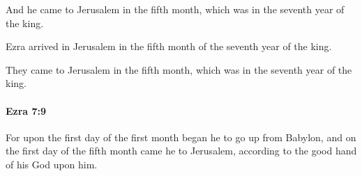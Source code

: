 			\begin{versebox}
					\item[BHS] 
					\item[LXX] 
					\item[ASV] And he came to Jerusalem in the fifth month, which was in the seventh year of the king.
					\item[NIV] Ezra arrived in Jerusalem in the fifth month of the seventh year of the king.
					\item[NRSV] They came to Jerusalem in the fifth month, which was in the seventh year of the king.
			\end{versebox}

		\paragraph{Ezra 7:9} %
			\label{EZRA-7-9}

			For upon the first day of the first month began he to go up from Babylon, and on the first day of the fifth month came he to Jerusalem, according to the good hand of his God upon him.

